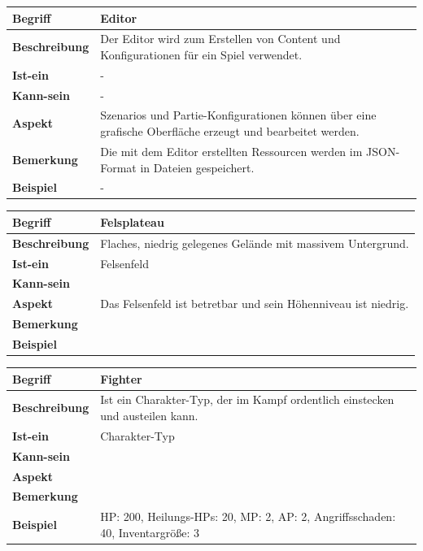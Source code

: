 \documentclass{uulm-assignment}
\begin{document}
\begin{tabularx}{16cm}{|l|X|}
\hline
\textbf{Begriff} & \textbf{Editor} \\
\hline
\textbf{Beschreibung} & Der Editor wird zum Erstellen von Content und Konfigurationen für ein Spiel verwendet. \\
\hline
\textbf{Ist-ein} & - \\
\hline
\textbf{Kann-sein} & - \\
\hline
\textbf{Aspekt} & Szenarios und Partie-Konfigurationen können über eine grafische Oberfläche erzeugt und bearbeitet werden. \\
\hline
\textbf{Bemerkung} & Die mit dem Editor erstellten Ressourcen werden im JSON-Format in Dateien gespeichert. \\
\hline
\textbf{Beispiel} & - \\
\hline
\end{tabularx}

\begin{tabularx}{16cm}{|l|X|}
\hline
\textbf{Begriff} & \textbf{Felsplateau} \\
\hline
\textbf{Beschreibung} & Flaches, niedrig gelegenes Gelände mit massivem Untergrund. \\
\hline
\textbf{Ist-ein} & Felsenfeld\\
\hline
\textbf{Kann-sein} & \\
\hline
\textbf{Aspekt} & Das Felsenfeld ist betretbar und sein Höhenniveau ist niedrig.\\
\hline
\textbf{Bemerkung} &  \\
\hline
\textbf{Beispiel} &  \\
\hline
\end{tabularx}

\begin{tabularx}{16cm}{|l|X|}
\hline
\textbf{Begriff} & \textbf{Fighter} \\
\hline
\textbf{Beschreibung} & Ist ein Charakter-Typ, der im Kampf ordentlich einstecken und austeilen kann. \\
\hline
\textbf{Ist-ein} & Charakter-Typ\\
\hline
\textbf{Kann-sein} & \\
\hline
\textbf{Aspekt} & \\
\hline
\textbf{Bemerkung} &  \\
\hline
\textbf{Beispiel} & HP: 200, Heilungs-HPs: 20, MP: 2, AP: 2, Angriffsschaden: 40, Inventargröße: 3 \\
\hline
\end{tabularx}
\end{document}
